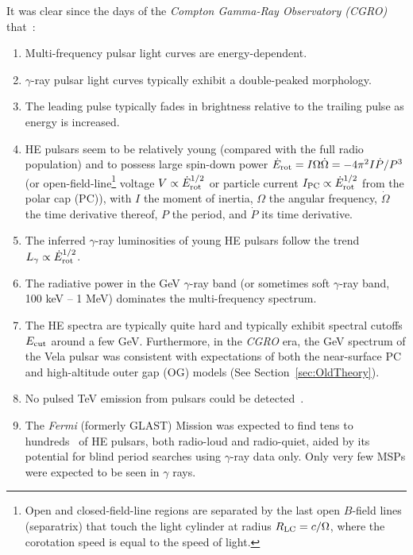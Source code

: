 \documentclass{PoS}
\begin{document}
It was clear since the days of the \textit{Compton Gamma-Ray Observatory (CGRO)} that~\cite{Thompson2004}:
\begin{enumerate}
  \item Multi-frequency pulsar light curves are energy-dependent.
  \item $\gamma$-ray pulsar light curves typically exhibit a double-peaked morphology.
  \item The leading pulse typically fades in brightness relative to the trailing pulse as energy is increased.
  \item HE pulsars seem to be relatively young (compared with the full radio population) and to possess large spin-down power $\dot{E}_{\rm rot}=I\Omega\dot{\Omega} = -4\pi^2I\dot{P}/P^3$ (or open-field-line\footnote{Open and closed-field-line regions are separated by the last open $B$-field lines (separatrix) that touch the light cylinder at radius $R_{\rm LC} = c/\Omega$, where the corotation speed is equal to the speed of light.} voltage $V\propto\dot{E}_{\rm rot}^{1/2}$ or particle current $I_{\rm PC}\propto\dot{E}_{\rm rot}^{1/2}$ from the polar cap (PC)), with $I$ the moment of inertia, $\Omega$ the angular frequency, $\dot{\Omega}$ the time derivative thereof, $P$ the period, and $\dot{P}$ its time derivative.
  \item The inferred $\gamma$-ray luminosities of young HE pulsars follow the trend $L_\gamma\propto\dot{E}_{\rm rot}^{1/2}$.
  \item The radiative power in the GeV $\gamma$-ray band (or sometimes soft $\gamma$-ray band, 100 keV -- 1 MeV) dominates the multi-frequency spectrum.
  \item The HE spectra are typically quite hard and typically exhibit spectral cutoffs $E_{\rm cut}$ around a few GeV. Furthermore, in the \textit{CGRO} era, the GeV spectrum of the Vela pulsar was consistent with expectations of both the near-surface PC and high-altitude outer gap (OG) models (See Section~\ref{sec:OldTheory}).
  \item No pulsed TeV emission from pulsars could be detected~\cite{Schmidt05}.
  \item The \textit{Fermi} (formerly GLAST) Mission was expected to find tens to hundreds~\cite{Gonthier04,Gonthier07,Watters11} of HE pulsars, both radio-loud and radio-quiet, aided by its potential for blind period searches using $\gamma$-ray data only. Only very few MSPs were expected to be seen in $\gamma$ rays.
\end{enumerate}
\end{document}
